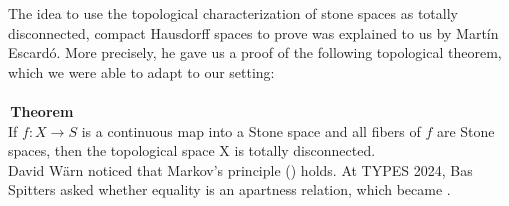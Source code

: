 The idea to use the topological characterization of stone spaces as totally disconnected, compact Hausdorff spaces to prove  was explained to us by Martín Escardó. More precisely, he gave us a proof of the following topological theorem, which we were able to adapt to our setting:\\
~\\
\,\textbf{Theorem}\\
  If $f : X \to S$ is a continuous map into a Stone space and all fibers of $f$ are Stone spaces, then the topological space X is totally disconnected. \\

David Wärn noticed that Markov's principle () holds. 
At TYPES 2024, Bas Spitters asked whether equality is an apartness relation, 
which became .

